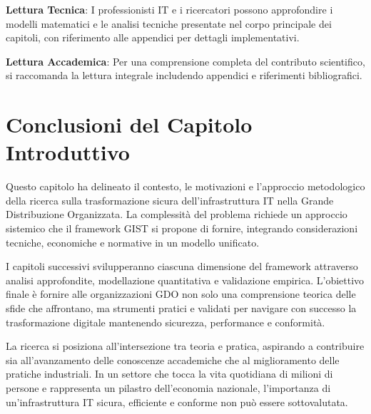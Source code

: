 \textbf{Lettura Tecnica}: I professionisti IT e i ricercatori possono approfondire i modelli matematici e le analisi tecniche presentate nel corpo principale dei capitoli, con riferimento alle appendici per dettagli implementativi.

\textbf{Lettura Accademica}: Per una comprensione completa del contributo scientifico, si raccomanda la lettura integrale includendo appendici e riferimenti bibliografici.

\section{Conclusioni del Capitolo Introduttivo}

Questo capitolo ha delineato il contesto, le motivazioni e l'approccio metodologico della ricerca sulla trasformazione sicura dell'infrastruttura IT nella Grande Distribuzione Organizzata. La complessità del problema richiede un approccio sistemico che il framework GIST si propone di fornire, integrando considerazioni tecniche, economiche e normative in un modello unificato.

I capitoli successivi svilupperanno ciascuna dimensione del framework attraverso analisi approfondite, modellazione quantitativa e validazione empirica. L'obiettivo finale è fornire alle organizzazioni GDO non solo una comprensione teorica delle sfide che affrontano, ma strumenti pratici e validati per navigare con successo la trasformazione digitale mantenendo sicurezza, performance e conformità.

La ricerca si posiziona all'intersezione tra teoria e pratica, aspirando a contribuire sia all'avanzamento delle conoscenze accademiche che al miglioramento delle pratiche industriali. In un settore che tocca la vita quotidiana di milioni di persone e rappresenta un pilastro dell'economia nazionale, l'importanza di un'infrastruttura IT sicura, efficiente e conforme non può essere sottovalutata.

